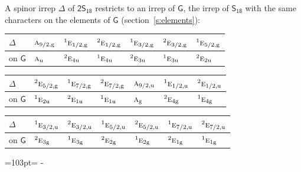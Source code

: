 \documentclass[10pt,a4paper]{article}
\newcommand{\needspace}[1]{\par\penalty-100\begingroup\dimen0=#1\relax\dimen2=\pagegoal
  \advance\dimen2-\pagetotal\ifdim\dimen0>\dimen2\relax\ifdim\dimen2>0pt\vfil\break\fi\fi
  \endgroup}
\numberwithin{equation}{section}
\newcommand{\grp}[1]{\mathsf{#1}}
\newcommand{\irr}[1]{\text{\normalfont\scshape #1}}
\newcommand{\conjpair}[1]{{}^{#1}}
\newcommand{\ptag}[1]{\mathrm{#1}}
\begin{document}
A spinor irrep $\Delta$ of \href{2S18.pdf}{$\grp{2S_{18}}$} restricts to an irrep of $\grp{G}$, the irrep of $\grp{S_{18}}$ with the same characters on the elements of $\grp{G}$ (section~\ref{s:elements}):
\begin{center}\begin{tabular}{@{}lllllll@{}}\toprule
$\Delta$ & $\irr{a}_{9/2,\ptag{g}}$ & $\conjpair{1}\irr{e}_{1/2,\ptag{g}}$ & $\conjpair{2}\irr{e}_{1/2,\ptag{g}}$ & $\conjpair{1}\irr{e}_{3/2,\ptag{g}}$ & $\conjpair{2}\irr{e}_{3/2,\ptag{g}}$ & $\conjpair{1}\irr{e}_{5/2,\ptag{g}}$\\\midrule
on $\grp{G}$ & $\irr{a}_{\ptag{u}}$ & $\conjpair{2}\irr{e}_{4\ptag{u}}$ & $\conjpair{1}\irr{e}_{4\ptag{u}}$ & $\conjpair{2}\irr{e}_{3\ptag{u}}$ & $\conjpair{1}\irr{e}_{3\ptag{u}}$ & $\conjpair{2}\irr{e}_{2\ptag{u}}$\\
\bottomrule\end{tabular}\end{center}
\begin{center}\begin{tabular}{@{}lllllll@{}}\toprule
$\Delta$ & $\conjpair{2}\irr{e}_{5/2,\ptag{g}}$ & $\conjpair{1}\irr{e}_{7/2,\ptag{g}}$ & $\conjpair{2}\irr{e}_{7/2,\ptag{g}}$ & $\irr{a}_{9/2,\ptag{u}}$ & $\conjpair{1}\irr{e}_{1/2,\ptag{u}}$ & $\conjpair{2}\irr{e}_{1/2,\ptag{u}}$\\\midrule
on $\grp{G}$ & $\conjpair{1}\irr{e}_{2\ptag{u}}$ & $\conjpair{2}\irr{e}_{1\ptag{u}}$ & $\conjpair{1}\irr{e}_{1\ptag{u}}$ & $\irr{a}_{\ptag{g}}$ & $\conjpair{2}\irr{e}_{4\ptag{g}}$ & $\conjpair{1}\irr{e}_{4\ptag{g}}$\\
\bottomrule\end{tabular}\end{center}
\begin{center}\begin{tabular}{@{}lllllll@{}}\toprule
$\Delta$ & $\conjpair{1}\irr{e}_{3/2,\ptag{u}}$ & $\conjpair{2}\irr{e}_{3/2,\ptag{u}}$ & $\conjpair{1}\irr{e}_{5/2,\ptag{u}}$ & $\conjpair{2}\irr{e}_{5/2,\ptag{u}}$ & $\conjpair{1}\irr{e}_{7/2,\ptag{u}}$ & $\conjpair{2}\irr{e}_{7/2,\ptag{u}}$\\\midrule
on $\grp{G}$ & $\conjpair{2}\irr{e}_{3\ptag{g}}$ & $\conjpair{1}\irr{e}_{3\ptag{g}}$ & $\conjpair{2}\irr{e}_{2\ptag{g}}$ & $\conjpair{1}\irr{e}_{2\ptag{g}}$ & $\conjpair{2}\irr{e}_{1\ptag{g}}$ & $\conjpair{1}\irr{e}_{1\ptag{g}}$\\
\bottomrule\end{tabular}\end{center}
\needspace{103pt}
\end{document}
